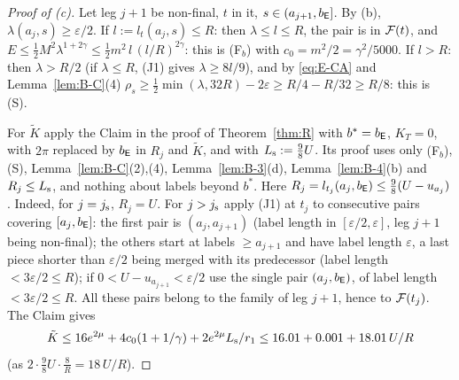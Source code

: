 \begin{proof}[Proof of \textup{(c)}]
Let leg $j+1$ be non-final, $t$ in it, $s\in(a_{j+1},b_{\mathsf E}]$. By (b), $\lambda(a_j,s)\ge\varepsilon/2$. If $l:=l_t(a_j,s)\le R$:
then $\lambda\le l\le R$, the pair is in $\mathcal F(t)$, and $E\le\frac12M^2\lambda^{1+2\gamma}\le\frac12m^2\,l\,(l/R)^{2\gamma}$: this is
\textup{(F$_b$)} with $c_0=m^2/2=\gamma^2/5000$. If $l>R$: then $\lambda>R/2$ (if $\lambda\le R$, (J1) gives $\lambda\ge8l/9$),
and by \eqref{eq:E-CA} and Lemma~\ref{lem:B-C}(4) $\rho_s\ge\frac12\min(\lambda,32R)-2\varepsilon\ge R/4-R/32\ge R/8$: this is
\textup{(S)}.

For $\tilde K$ apply the Claim in the proof of Theorem~\ref{thm:R} with $b^*=b_{\mathsf E}$, $K_T=0$, with $2\pi$ replaced by $b_{\mathsf E}$ in
$R_j$ and $\tilde K$, and with $L_{\mathrm s}:=\frac98U$. Its proof uses only \textup{(F$_b$)}, \textup{(S)}, Lemma~\ref{lem:B-C}(2),(4),
Lemma~\ref{lem:B-3}(d), Lemma~\ref{lem:B-4}(b) and $R_j\le L_{\mathrm s}$, and nothing about labels beyond $b^*$. Here
$R_j=l_{t_j}(a_j,b_{\mathsf E})\le\frac98(U-u_{a_j})$. Indeed, for $j=j_{\mathrm s}$, $R_j=U$. For $j>j_{\mathrm s}$ apply (J1) at $t_j$ to consecutive pairs
covering $[a_j,b_{\mathsf E}]$: the first pair is $(a_j,a_{j+1})$ (label length in $[\varepsilon/2,\varepsilon]$, leg $j+1$ being non-final);
the others start at labels $\ge a_{j+1}$ and have label length $\varepsilon$, a last piece shorter than $\varepsilon/2$
being merged with its predecessor (label length $<3\varepsilon/2\le R$); if $0<U-u_{a_{j+1}}<\varepsilon/2$ use the single pair $(a_j,b_{\mathsf E})$, of label length
$<3\varepsilon/2\le R$. All these pairs belong to the family of leg $j+1$, hence to $\mathcal F(t_j)$. The Claim gives
\[
\tilde K\le16e^{2\mu}+4c_0(1+1/\gamma)+2e^{2\mu}L_{\mathrm s}/r_1\le16.01+0.001+18.01\,U/R
\]
(as $2\cdot\frac98U\cdot\frac8R=18\,U/R$).
\end{proof}


